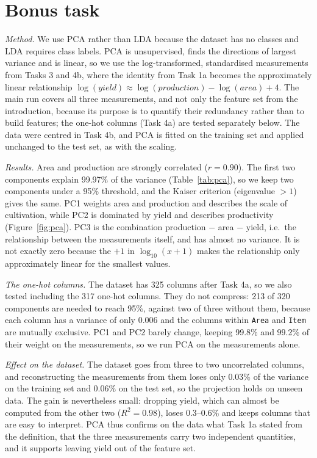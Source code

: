 \documentclass{article}
\begin{document}
\section{Bonus task}

\textit{Method.} We use PCA rather than LDA because the dataset has no classes and LDA requires class labels. PCA is unsupervised, finds the directions of largest variance and is linear, so we use the log-transformed, standardised measurements from Tasks 3 and 4b, where the identity from Task 1a becomes the approximately linear relationship $\log(\mathit{yield}) \approx \log(\mathit{production}) - \log(\mathit{area}) + 4$. The main run covers all three measurements, and not only the feature set from the introduction, because its purpose is to quantify their redundancy rather than to build features; the one-hot columns (Task 4a) are tested separately below. The data were centred in Task 4b, and PCA is fitted on the training set and applied unchanged to the test set, as with the scaling.

\textit{Results.} Area and production are strongly correlated ($r = 0.90$). The first two components explain 99.97\% of the variance (Table~\ref{tab:pca}), so we keep two components under a 95\% threshold, and the Kaiser criterion (eigenvalue $> 1$) gives the same. PC1 weights area and production and describes the scale of cultivation, while PC2 is dominated by yield and describes productivity (Figure~\ref{fig:pca}). PC3 is the combination production $-$ area $-$ yield, i.e.\ the relationship between the measurements itself, and has almost no variance. It is not exactly zero because the $+1$ in $\log_{10}(x+1)$ makes the relationship only approximately linear for the smallest values.

\textit{The one-hot columns.} The dataset has 325 columns after Task 4a, so we also tested including the 317 one-hot columns. They do not compress: 213 of 320 components are needed to reach 95\%, against two of three without them, because each column has a variance of only 0.006 and the columns within \texttt{Area} and \texttt{Item} are mutually exclusive. PC1 and PC2 barely change, keeping 99.8\% and 99.2\% of their weight on the measurements, so we run PCA on the measurements alone.

\textit{Effect on the dataset.} The dataset goes from three to two uncorrelated columns, and reconstructing the measurements from them loses only 0.03\% of the variance on the training set and 0.06\% on the test set, so the projection holds on unseen data. The gain is nevertheless small: dropping yield, which can almost be computed from the other two ($R^2 = 0.98$), loses 0.3--0.6\% and keeps columns that are easy to interpret. PCA thus confirms on the data what Task 1a stated from the definition, that the three measurements carry two independent quantities, and it supports leaving yield out of the feature set.
\end{document}

